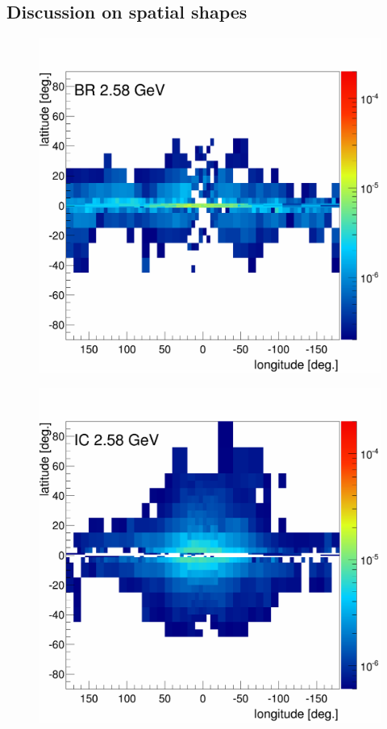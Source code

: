 \subsection{Discussion on spatial shapes}
\begin{figure}
  \centering
  \begin{minipage}[h]{0.45\textwidth}
  	\centering
	\includegraphics[width=1.\linewidth]{pic/results/MCRonly_BR_fluxE12_skymap.png}
  	\label{fig:MCRonly_skymap_BR}
  \end{minipage}
  \hfill
  \begin{minipage}[h]{0.45\textwidth}
  	\centering
	\includegraphics[width=1.\linewidth]{pic/results/MCRonly_IC_fluxE12_skymap.png}

\end{minipage}
\end{figure}
